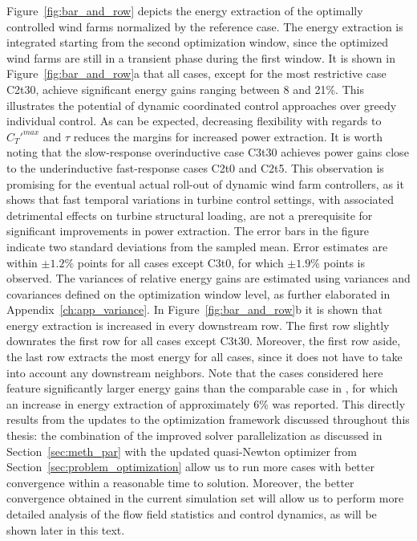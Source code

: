 Figure~\ref{fig:bar_and_row} depicts the energy extraction of the optimally controlled wind farms normalized by the reference case. The energy extraction is integrated starting from the second optimization window, since the optimized wind farms are still in a transient phase during the first window. It is shown in Figure~\ref{fig:bar_and_row}a that all cases, except for the most restrictive case C2t30, achieve significant energy gains ranging between 8 and 21\%. This illustrates the potential of dynamic coordinated control approaches over greedy individual control. As can be expected, decreasing flexibility with regards to $C_T'^{max}$ and $\tau$ reduces the margins for increased power extraction. It is worth noting that the slow-response overinductive case C3t30 achieves power gains close to the underinductive fast-response cases C2t0 and C2t5. This observation is promising for the eventual actual roll-out of dynamic wind farm controllers, as it shows that fast temporal variations in turbine control settings, with associated detrimental effects on turbine structural loading, are not a prerequisite for significant improvements in power extraction. The error bars in the figure indicate two standard deviations from the sampled mean. Error estimates are within $\pm 1.2$\% points for all cases except C3t0, for which $\pm 1.9$\% points is observed. The variances of relative energy gains are estimated using variances and covariances defined on the optimization window level, as further elaborated in Appendix~\ref{ch:app_variance}. In Figure~\ref{fig:bar_and_row}b it is shown that energy extraction is increased in every downstream row. The first row slightly downrates the first row for all cases except C3t30. Moreover, the first row aside, the last row extracts the most energy for all cases, since it does not have to take into account any downstream neighbors. Note that the cases considered here feature significantly larger energy gains than the comparable case in \cite{goit2016optimal}, for which an increase in energy extraction of approximately 6\% was reported. This directly results from the updates to the optimization framework discussed throughout this thesis: the combination of the improved solver parallelization as discussed in Section~\ref{sec:meth_par} with the updated quasi-Newton optimizer from Section~\ref{sec:problem_optimization} allow us to run more cases with better convergence within a reasonable time to solution. Moreover, the better convergence obtained in the current simulation set will allow us to perform more detailed analysis of the flow field statistics and control dynamics, as will be shown later in this text.

